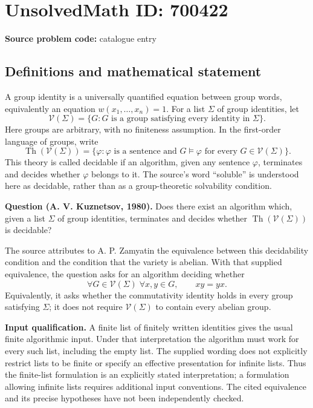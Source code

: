 \documentclass[11pt]{article}
\begin{document}
\section*{UnsolvedMath ID: 700422}
\textbf{Source problem code:} catalogue entry
\subsection{Definitions and mathematical statement}
A group identity is a universally quantified equation between group words, equivalently an equation \(w(x_1,\ldots,x_n)=1\). For a list \(\Sigma\) of group identities, let
\[
\mathcal V(\Sigma)=\{G: G\text{ is a group satisfying every identity in }\Sigma\}.
\]
Here groups are arbitrary, with no finiteness assumption. In the first-order language of groups, write
\[
\operatorname{Th}(\mathcal V(\Sigma))
=\{\varphi:\varphi\text{ is a sentence and }G\models\varphi\text{ for every }G\in\mathcal V(\Sigma)\}.
\]
This theory is called decidable if an algorithm, given any sentence \(\varphi\), terminates and decides whether \(\varphi\) belongs to it. The source's word ``soluble'' is understood here as decidable, rather than as a group-theoretic solvability condition.

\textbf{Question (A. V. Kuznetsov, 1980).} Does there exist an algorithm which, given a list \(\Sigma\) of group identities, terminates and decides whether \(\operatorname{Th}(\mathcal V(\Sigma))\) is decidable?

The source attributes to A. P. Zamyatin the equivalence between this decidability condition and the condition that the variety is abelian. With that supplied equivalence, the question asks for an algorithm deciding whether
\[
\forall G\in\mathcal V(\Sigma)\;\forall x,y\in G,\qquad xy=yx.
\]
Equivalently, it asks whether the commutativity identity holds in every group satisfying \(\Sigma\); it does not require \(\mathcal V(\Sigma)\) to contain every abelian group.

\textbf{Input qualification.} A finite list of finitely written identities gives the usual finite algorithmic input. Under that interpretation the algorithm must work for every such list, including the empty list. The supplied wording does not explicitly restrict lists to be finite or specify an effective presentation for infinite lists. Thus the finite-list formulation is an explicitly stated interpretation; a formulation allowing infinite lists requires additional input conventions. The cited equivalence and its precise hypotheses have not been independently checked.
\end{document}
